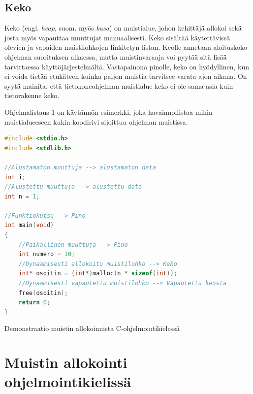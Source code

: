 \subsection{Keko}

Keko (engl. \textit{heap}, suom. myös \textit{kasa}) on muistialue, johon kehittäjä allokoi sekä josta myös vapauttaa muuttujat manuaalisesti. Keko sisältää käytettävissä olevien ja vapaiden muistilohkojen linkitetyn listan. Keolle annetaan aloituskoko ohjelman suorituksen alkaessa, mutta muistinvaraaja voi pyytää sitä lisää tarvittaessa käyttöjärjestelmältä. Vastapainona pinolle, keko on hyödyllinen, kun ei voida tietää etukäteen kuinka paljon muistia tarvitsee varata ajon aikana.\cite{mmic2010} On syytä mainita, että tietokoneohjelman muistialue keko ei ole sama asia kuin tietorakenne keko.

Ohjelmalistaus 1 on käytännön esimerkki, joka havainnollistaa mihin muistialueeseen kukin koodirivi sijoittuu ohjelman muistissa.

\begin{algorithm}[tbh]
\begin{lstlisting}[language=C]
#include <stdio.h>
#include <stdlib.h>

//Alustamaton muuttuja --> alustamaton data
int i;
//Alustettu muuttuja --> alustettu data 
int n = 1; 

//Funktiokutsu --> Pino
int main(void)  
{  
    //Paikallinen muuttuja --> Pino
    int numero = 10;
    //Dynaamisesti allokoitu muistilohko --> Keko    
    int* osoitin = (int*)malloc(n * sizeof(int));
    //Dynaamisesti vapautettu muistilohko --> Vapautettu keosta  
    free(osoitin);
    return 0;
}
\end{lstlisting}
\caption{Demonstraatio muistin allokoinnista C-ohjelmointikielessä\label{alg:Demonstraatio}}
\end{algorithm}

\section{Muistin allokointi ohjelmointikielissä}

